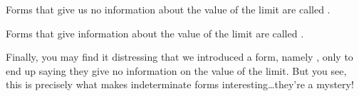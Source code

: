 \documentclass{ximera}
\begin{document}
\begin{definition}
Forms that give us no information about the value of the limit are
called .

Forms that give information about the value of the limit are called
.
\end{definition}  

Finally, you may find it distressing that we introduced a form, namely
\zeroOverZero, only to end up saying they give no information on the
value of the limit. But you see, this is precisely what makes
indeterminate forms interesting\dots they're a mystery!
\end{document}

